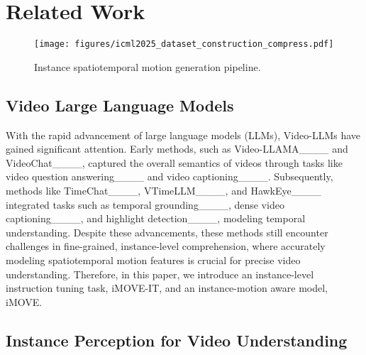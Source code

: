 \section{Related Work}
\begin{figure*}
    \centering
    \texttt{[image: figures/icml2025\_dataset\_construction\_compress.pdf]}
    \caption{Instance spatiotemporal motion generation pipeline.}
    \label{fig:motion_anno}
    \vspace{-0.5cm}
\end{figure*}
\subsection{Video Large Language Models}
With the rapid advancement of large language models (LLMs), Video-LLMs have gained significant attention. Early methods, such as Video-LLAMA____ and VideoChat____, captured the overall semantics of videos through tasks like video question answering____ and video captioning____. Subsequently, methods like TimeChat____, VTimeLLM____, and HawkEye____ integrated tasks such as temporal grounding____, dense video captioning____, and highlight detection____, modeling temporal understanding. Despite these advancements, these methods still encounter challenges in fine-grained, instance-level comprehension, where accurately modeling spatiotemporal motion features is crucial for precise video understanding. Therefore, in this paper, we introduce an instance-level instruction tuning task, iMOVE-IT, and an instance-motion aware model, iMOVE.


\subsection{Instance Perception for Video Understanding}


